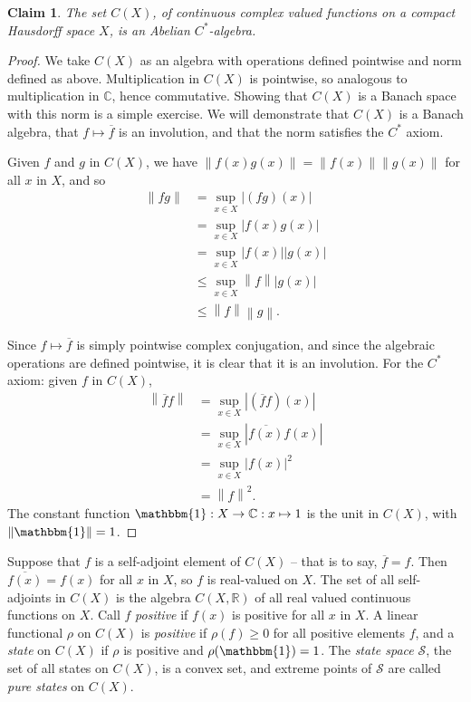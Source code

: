 \documentclass[11pt,a4paper]{report}
\theoremstyle{plain}
\newtheorem*{claim}{Claim}
\theoremstyle{definition}
\newcommand{\1}{\mathbbm{1}}
\newcommand{\C}{\mathbb{C}}
\newcommand{\R}{\mathbb{R}}
\newcommand{\CX}{C(X)}
\renewcommand{\S}{\mathscr{S}}
\renewcommand{\bar}{\overline}
\begin{document}
\begin{claim}
	The set $\CX$, of continuous complex valued functions on a compact Hausdorff 
	space $X$, is an Abelian $C^\ast$-algebra.
\end{claim}
\begin{proof}
	We take $\CX$ as an algebra with operations defined pointwise and norm defined 
	as above. Multiplication in $\CX$ is pointwise, so analogous to multiplication 
	in $\C$, hence commutative. Showing that $\CX$ is a Banach space with this norm 
	is a simple exercise. We will demonstrate that $\CX$ is a Banach algebra, that 
	$f\mapsto\overline{f}$ is an involution, and that the norm satisfies the 
	$C^\ast$ axiom.
	
	Given $f$ and $g$ in $\CX$, we have $\left\|f(x)g(x)\right\| = 
	\left\|f(x)\right\|\left\|g(x)\right\|$ for all $x$ in $X$, and so 
	\begin{align*}
				\left\|fg\right\| 
		&= 		\sup_{x\in X}|(fg)(x)|														\\
		&= 		\sup_{x\in X}|f(x)g(x)|														\\
		&=		\sup_{x\in X}|f(x)||g(x)|													\\
		&\leq	\sup_{x\in X}\left\|f\right\||g(x)|											\\
		&\leq	\left\|f\right\|\left\|g\right\|.
	\end{align*}
	
	Since $f\mapsto\overline{f}$ is simply pointwise complex conjugation, and since the 
	algebraic operations are defined pointwise, it is clear that it is an 
	involution. For the $C^\ast$ axiom: given $f$ in $\CX$,
	\begin{align*}
				\left\|\bar f f\right\| 
		&= 		\sup_{x\in X}|(\bar f f)(x)|												\\
		&= 		\sup_{x\in X}|\bar{f(x)} f(x)|												\\
		&=		\sup_{x\in X}|f(x)|^2														\\
		&=		\left\|f\right\|^2.
	\end{align*}
	The constant function $\1:X\to\C:x\mapsto 1$ is the unit in $\CX$, 
	with $\left\|\1\right\| = 1$.
\end{proof}

Suppose that $f$ is a self-adjoint element of $\CX$ -- that is to say, $\bar f = 
f$. Then~$\bar{f(x)} = f(x)$ for all $x$ in $X$, so $f$ is real-valued on $X$. 
The set of all self-adjoints in $\CX$ is the algebra $C(X,\R)$ of all real 
valued continuous functions on $X$. Call $f$ \emph{positive} if $f(x)$ is 
positive for all $x$ in $X$. 
A linear functional $\rho$ on $\CX$ is \emph{positive} if $\rho(f)\geq 0$ for 
all positive elements $f$, and a \emph{state} on $\CX$ if $\rho$ is positive and 
$\rho(\1)=1$. The \emph{state space} $\S$, the set of all states on $\CX$, is a 
convex set, and extreme points of $\S$ are called \emph{pure states} on $\CX$.
\end{document}

